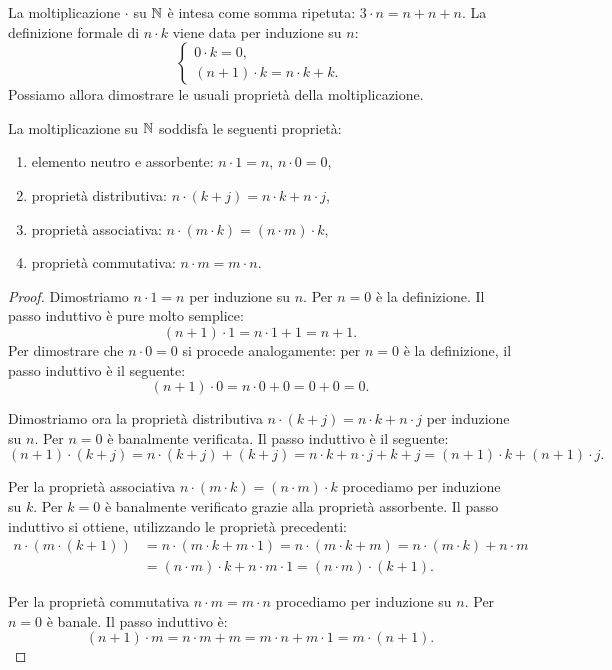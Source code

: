 La moltiplicazione $\cdot$ su ${\mathbb N}$ è intesa come somma ripetuta:
$3\cdot n = n + n + n$. 
La definizione formale di $n\cdot k$ viene data per induzione su $n$:
\[
 \begin{cases}
    0\cdot k = 0, \\
    (n+1) \cdot k = n\cdot k + k.
 \end{cases}  
\]
Possiamo allora dimostrare le usuali proprietà della moltiplicazione.
\begin{theorem}
La moltiplicazione su ${\mathbb N}$ soddisfa le seguenti proprietà:
\begin{enumerate}
  \item elemento neutro e assorbente: $n\cdot 1=n$, $n\cdot 0=0$,
  \item proprietà distributiva: $n\cdot(k+j) = n\cdot k + n\cdot j$,
  \item proprietà associativa: $n\cdot(m\cdot k) = (n\cdot m)\cdot k$,
  \item proprietà commutativa: $n\cdot m = m\cdot n$.
\end{enumerate}
\end{theorem}
\begin{proof}
Dimostriamo $n\cdot 1=n$ per induzione su $n$. 
Per $n=0$ è la definizione. Il passo induttivo è pure molto semplice:
\[
  (n+1)\cdot 1 = n\cdot 1 + 1 = n + 1.  
\]
Per dimostrare che $n\cdot 0 = 0$ si procede analogamente:
per $n=0$ è la definizione, il passo induttivo è il seguente:
\[
  (n+1)\cdot 0 = n\cdot 0 + 0 = 0 + 0 = 0.  
\]

Dimostriamo ora la proprietà distributiva $n\cdot(k+j)=n\cdot k + n\cdot j$ 
per induzione su $n$. Per $n=0$ è banalmente verificata. Il passo induttivo
è il seguente:
\[
(n+1)\cdot(k+j) 
= n\cdot(k+j) + (k+j) 
=  n\cdot k + n\cdot j + k + j
= (n+1)\cdot k + (n+1)\cdot j.
\]

Per la proprietà associativa $n\cdot(m\cdot k) = (n\cdot m)\cdot k$
procediamo per induzione su $k$. Per $k=0$ è banalmente verificato grazie 
alla proprietà assorbente.
Il passo induttivo si ottiene, utilizzando le proprietà precedenti:
\begin{align*}
  n\cdot(m\cdot(k+1)) 
  &= n\cdot(m\cdot k + m\cdot 1)
  = n\cdot(m\cdot k + m)
  = n\cdot(m\cdot k) + n\cdot m\\
  &= (n\cdot m)\cdot k + n\cdot m\cdot 1
  = (n\cdot m)\cdot(k+1).
\end{align*}

Per la proprietà commutativa $n\cdot m = m\cdot n$ procediamo per induzione 
su $n$. Per $n=0$ è banale. Il passo induttivo è:
\[
(n+1)\cdot m = n\cdot m + m = m\cdot n + m\cdot 1 = m\cdot(n+1).  
\]
\end{proof}

